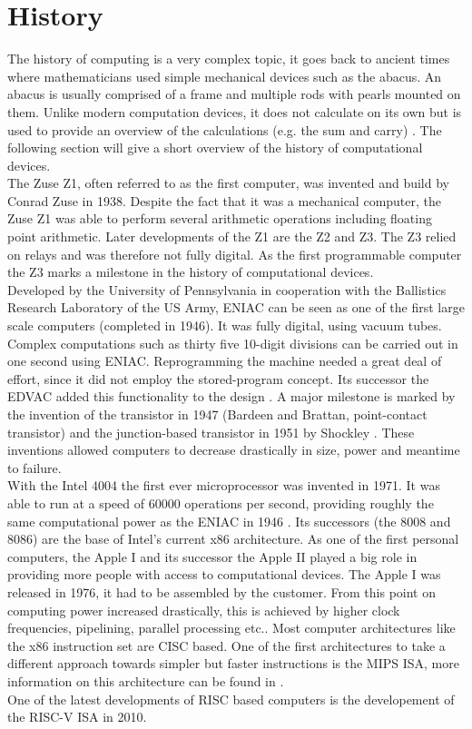 \section{History}
The history of computing is a very complex topic, it goes back to ancient times where mathematicians used simple mechanical devices such as the abacus. An abacus is usually comprised of a frame and multiple rods with pearls mounted on them. Unlike modern computation devices, it does not calculate on its own but is used to provide an overview of the calculations (e.g. the sum and carry) \cite{ORegan:2021}. The following section will give a short overview of the history of computational devices.\\
The Zuse Z1, often referred to as the first computer, was invented and build by Conrad Zuse in 1938.
Despite the fact that it was a mechanical computer, the Zuse Z1 was able to perform several arithmetic operations including floating point arithmetic. Later developments of the Z1 are the Z2 and Z3. The Z3 relied on relays and was therefore not fully digital. As the first programmable computer the Z3 marks a milestone in the history of computational devices\cite{ORegan:2021}.\\
Developed by the University of Pennsylvania in cooperation with the Ballistics Research Laboratory of the US Army, \ac{ENIAC} can be seen as one of the first large scale computers (completed in 1946). It was fully digital, using vacuum tubes. Complex computations such as thirty five 10-digit divisions can be carried out in one second using \ac{ENIAC}. Reprogramming the machine needed a great deal of effort, since it did not employ the stored-program concept. Its successor the 
\ac{EDVAC} added this functionality to the design \cite{ORegan:2021}. 
A major milestone is marked by the invention of the transistor in 1947 (Bardeen and Brattan, point-contact transistor) and the junction-based transistor in 1951 by Shockley \cite{ORegan:2021}. These inventions allowed computers to decrease drastically in size, power and meantime to failure.\\
With the Intel 4004 the first ever microprocessor was invented in 1971. It was able to run at a speed of 60000 operations per second, providing roughly the same computational power as the \ac{ENIAC} in 1946 \cite{ORegan:2021}. Its successors (the 8008 and 8086) are the base of Intel's current x86 architecture.
As one of the first personal computers, the Apple I and its successor the Apple II played a big role in providing more people with access to computational devices. The Apple I was released in 1976, it had to be assembled by the customer\cite{ORegan:2021}. 
From this point on computing power increased drastically, this is achieved by higher clock frequencies, pipelining, parallel processing etc.. Most computer architectures like the x86 instruction set are \ac{CISC} based. One of the first architectures to take a different approach towards simpler but faster instructions is the \ac{MIPS} \ac{ISA}, more information on this architecture can be found in \cite{patterson:2020}.\\
One of the latest developments of \ac{RISC} based computers is the developement of the RISC-V \ac{ISA} in 2010.
